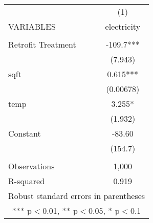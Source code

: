 \begin{tabular}{lc} \hline
 & (1) \\
VARIABLES & electricity \\ \hline
 &  \\
Retrofit Treatment & -109.7*** \\
 & (7.943) \\
sqft & 0.615*** \\
 & (0.00678) \\
temp & 3.255* \\
 & (1.932) \\
Constant & -83.60 \\
 & (154.7) \\
 &  \\
Observations & 1,000 \\
 R-squared & 0.919 \\ \hline
\multicolumn{2}{c}{ Robust standard errors in parentheses} \\
\multicolumn{2}{c}{ *** p$<$0.01, ** p$<$0.05, * p$<$0.1} \\
\end{tabular}
